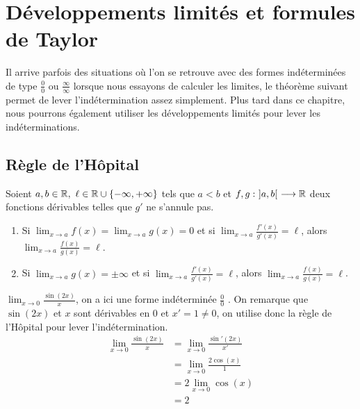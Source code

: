 \chapter{Développements limités et formules de Taylor}
\def\arraystretch{1}

\par Il arrive parfois des situations où l'on se retrouve avec des formes indéterminées de type \og $\frac{0}{0}$ \fg ou \og $\frac{\infty}{\infty}$ \fg lorsque nous essayons de calculer les limites, le théorème suivant permet de lever l'indétermination assez simplement.
Plus tard dans ce chapitre, nous pourrons également utiliser les développements limités pour lever les indéterminations.
\section{Règle de l'Hôpital}
\begin{theorem}
    Soient $a, b \in \mathbb{R},\ \ell \in \mathbb{R} \cup \{-\infty, +\infty\}$ tels que $a < b$ et $f, g : \ ]a, b[ \ \longrightarrow \mathbb{R}$ deux fonctions dérivables telles que $g'$ ne s'annule pas. 
    \begin{enumerate}
        \item Si $\lim_{x \to a} f(x) = \lim_{x \to a} g(x) = 0$ et si $\lim_{x \to a} \frac{f'(x)}{g'(x)} = \ell$, alors $\lim_{x \to a} \frac{f(x)}{g(x)} = \ell$.
        \item Si $\lim_{x \to a} g(x) = \pm \infty$ et si $\lim_{x \to a} \frac{f'(x)}{g'(x)} = \ell$, alors $\lim_{x \to a} \frac{f(x)}{g(x)} = \ell$.
    \end{enumerate}
\end{theorem}

\begin{example}
    $\lim_{x \to 0} \frac{\sin(2x)}{x}$, on a ici une forme indéterminée \og $\frac{0}{0}$ \fg.
    On remarque que $\sin(2x)$ et $x$ sont dérivables en 0 et $x' = 1 \neq 0$, on utilise donc la règle de l'Hôpital pour lever l'indétermination.
    \begin{align*}
        \lim_{x \to 0} \frac{\sin(2x)}{x} &= \lim_{x \to 0} \frac{\sin'(2x)}{x'} \\
        &= \lim_{x \to 0} \frac{2 \cos(x)}{1} \\
        &= 2 \lim_{x \to 0} \cos(x) \\
        &= 2
    \end{align*}
\end{example}

